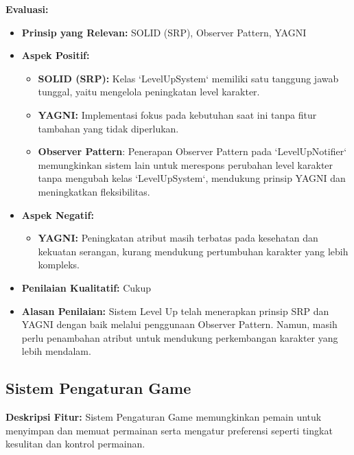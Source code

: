 \documentclass[12pt]{article}
\begin{document}
\textbf{Evaluasi:}
\begin{itemize}
    \item \textbf{Prinsip yang Relevan:} SOLID (SRP), Observer Pattern, YAGNI
    \item \textbf{Aspek Positif:}
    \begin{itemize}
        \item \textbf{SOLID (SRP):} Kelas `LevelUpSystem` memiliki satu tanggung jawab tunggal, yaitu mengelola peningkatan level karakter.
        \item \textbf{YAGNI:} Implementasi fokus pada kebutuhan saat ini tanpa fitur tambahan yang tidak diperlukan.
        \item \textbf{Observer Pattern}: Penerapan Observer Pattern pada `LevelUpNotifier` memungkinkan sistem lain untuk merespons perubahan level karakter tanpa mengubah kelas `LevelUpSystem`, mendukung prinsip YAGNI dan meningkatkan fleksibilitas.
    \end{itemize}
    \item \textbf{Aspek Negatif:}
    \begin{itemize}
        \item \textbf{YAGNI:} Peningkatan atribut masih terbatas pada kesehatan dan kekuatan serangan, kurang mendukung pertumbuhan karakter yang lebih kompleks.
    \end{itemize}
    \item \textbf{Penilaian Kualitatif:} Cukup
    \item \textbf{Alasan Penilaian:} Sistem Level Up telah menerapkan prinsip SRP dan YAGNI dengan baik melalui penggunaan Observer Pattern. Namun, masih perlu penambahan atribut untuk mendukung perkembangan karakter yang lebih mendalam.
\end{itemize}

\subsection{Sistem Pengaturan Game}
\textbf{Deskripsi Fitur:} Sistem Pengaturan Game memungkinkan pemain untuk menyimpan dan memuat permainan serta mengatur preferensi seperti tingkat kesulitan dan kontrol permainan.
\end{document}
